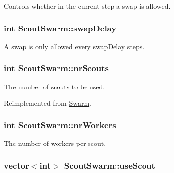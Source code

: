 Controls whether in the current step a swap is allowed. 

\hypertarget{classScoutSwarm_337dd6e4974bfe13d02985c393657bf2}{
\subsubsection{\setlength{\rightskip}{0pt plus 5cm}int {\bf ScoutSwarm::swapDelay}}}
\label{classScoutSwarm_337dd6e4974bfe13d02985c393657bf2}


A swap is only allowed every swapDelay steps. 

\hypertarget{classScoutSwarm_7a55b74b3e6528d7f16ac9a65357d43c}{
\subsubsection{\setlength{\rightskip}{0pt plus 5cm}int {\bf ScoutSwarm::nrScouts}}}
\label{classScoutSwarm_7a55b74b3e6528d7f16ac9a65357d43c}


The number of scouts to be used. 



Reimplemented from \hyperlink{classSwarm_6ec8b4463d83af484788490c203ae166}{Swarm}.\hypertarget{classScoutSwarm_83e2982030ed6a6b503b6f577edfdc09}{
\subsubsection{\setlength{\rightskip}{0pt plus 5cm}int {\bf ScoutSwarm::nrWorkers}}}
\label{classScoutSwarm_83e2982030ed6a6b503b6f577edfdc09}


The number of workers per scout. 

\hypertarget{classScoutSwarm_150661cd2f47adf19273d8cc838e4b0c}{
\subsubsection{\setlength{\rightskip}{0pt plus 5cm}vector$<$int$>$ {\bf ScoutSwarm::useScout}}}
\label{classScoutSwarm_150661cd2f47adf19273d8cc838e4b0c}


